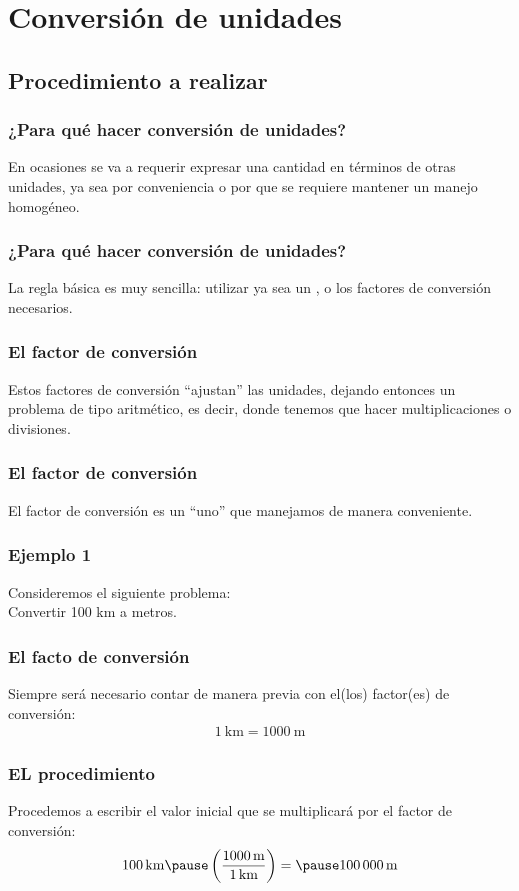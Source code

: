 \documentclass[14pt]{beamer}
\begin{document}
\section{Conversión de unidades}
\subsection{Procedimiento a realizar}

\begin{frame}
\frametitle{¿Para qué hacer conversión de unidades?}
En ocasiones se va a requerir expresar una cantidad en términos de otras unidades, ya sea por conveniencia o por que se requiere mantener un manejo homogéneo.
\end{frame}
\begin{frame}
\frametitle{¿Para qué hacer conversión de unidades?}
La regla básica es muy sencilla: \pause utilizar ya sea un , o los factores de conversión necesarios.
\end{frame}
\begin{frame}
\frametitle{El factor de conversión}
Estos factores de conversión \enquote{ajustan} las unidades, dejando entonces un problema de tipo aritmético, \pause es decir, donde tenemos que hacer multiplicaciones o divisiones.
\end{frame}
\begin{frame}
\frametitle{El factor de conversión}
El factor de conversión es un \enquote{uno} que manejamos de manera conveniente.
\end{frame}
\begin{frame}
\frametitle{Ejemplo 1}
Consideremos el siguiente problema:
\\
\bigskip
\pause
Convertir 100 km a metros.
\end{frame}
\begin{frame}
\frametitle{El facto de conversión}
Siempre será necesario contar de manera previa con el(los) factor(es) de conversión:
\pause
\begin{align*}
\SI{1}{\kilo\meter} = \SI{1000}{\meter}
\end{align*}
\end{frame}
\begin{frame}
\frametitle{EL procedimiento}
Procedemos a escribir el valor inicial que se multiplicará por el factor de conversión:
\pause
\begin{eqnarray*}
\begin{aligned}
\SI{100}{\kilo\meter} \pause \left( \dfrac{\SI{1000}{\meter}}{\SI{1}{\kilo\meter}} \right) = \pause \SI{100000}{\meter}
\end{aligned}
\end{eqnarray*}
\end{frame}
\end{document}
